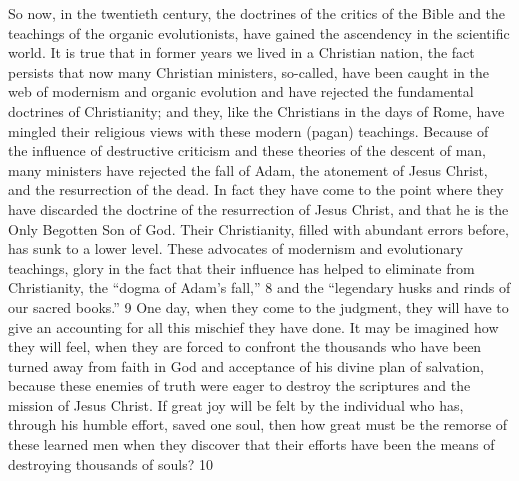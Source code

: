So now, in the twentieth century, the doctrines of the critics of the Bible and the teachings of
the organic evolutionists, have gained the ascendency in the scientific world. It is true that in
former years we lived in a Christian nation, the fact persists that now many Christian
ministers, so-called, have been caught in the web of modernism and organic evolution and
have rejected the fundamental doctrines of Christianity; and they, like the Christians in the
days of Rome, have mingled their religious views with these modern (pagan) teachings.
Because of the influence of destructive criticism and these theories of the descent of man,
many ministers have rejected the fall of Adam, the atonement of Jesus Christ, and the
resurrection of the dead. In fact they have come to the point where they have discarded the
doctrine of the resurrection of Jesus Christ, and that he is the Only Begotten Son of God.
Their Christianity, filled with abundant errors before, has sunk to a lower level. These
advocates of modernism and evolutionary teachings, glory in the fact that their influence has
helped to eliminate from Christianity, the ``dogma of Adam's fall,'' 8 and the ``legendary
husks and rinds of our sacred books.'' 9 One day, when they come to the judgment, they will
have to give an accounting for all this mischief they have done. It may be imagined how they
will feel, when they are forced to confront the thousands who have been turned away from
faith in God and acceptance of his divine plan of salvation, because these enemies of truth
were eager to destroy the scriptures and the mission of Jesus Christ. If great joy will be felt
by the individual who has, through his humble effort, saved one soul, then how great must be
the remorse of these learned men when they discover that their efforts have been the means
of destroying thousands of souls? 10

